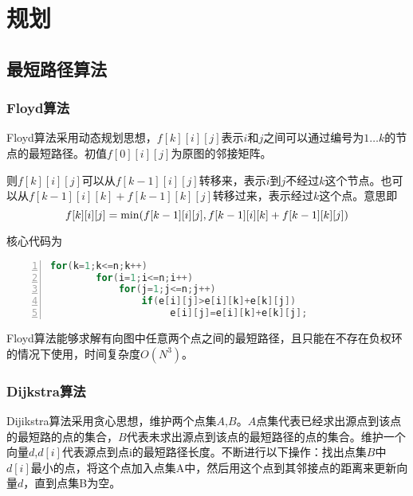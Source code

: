 \chapter{规划}
\section{最短路径算法}
\subsection{Floyd算法}
Floyd算法采用动态规划思想，$f[k][i][j]$表示$i$和$j$之间可以通过编号为$1 \dots k$的节点的最短路径。初值$f[0][i][j]$为原图的邻接矩阵。

则$f[k][i][j]$可以从$f[k-1][i][j]$转移来，表示$i$到$j$不经过$k$这个节点。也可以从$f[k-1][i][k]+f[k-1][k][j]$转移过来，表示经过$k$这个点。意思即
\begin{equation*}
	f[k][i][j] = \rm{min}(f[k-1][i][j], f[k-1][i][k]+f[k-1][k][j])
\end{equation*}

核心代码为
\begin{lstlisting}[language=c,numbers=left,firstnumber = 1,numberstyle=\tiny,breaklines = true,keywordstyle=\color{blue!70},commentstyle=\color{red!50!green!50!blue!50},frame=shadowbox, rulesepcolor=\color{red!20!green!20!blue!20}]
	for(k=1;k<=n;k++)
        for(i=1;i<=n;i++)
            for(j=1;j<=n;j++)
                if(e[i][j]>e[i][k]+e[k][j])
                     e[i][j]=e[i][k]+e[k][j];
\end{lstlisting}

Floyd算法能够求解有向图中任意两个点之间的最短路径，且只能在不存在负权环的情况下使用，时间复杂度$O(N^3)$。

\subsection{Dijkstra算法}
Dijikstra算法采用贪心思想，维护两个点集$A$,$B$。$A$点集代表已经求出源点到该点的最短路的点的集合，$B$代表未求出源点到该点的最短路径的点的集合。维护一个向量$d$,$d[i]$代表源点到点i的最短路径长度。不断进行以下操作：找出点集$B$中$d[i]$最小的点，将这个点加入点集A中，然后用这个点到其邻接点的距离来更新向量$d$，直到点集B为空。

